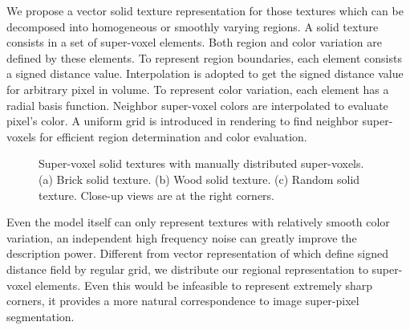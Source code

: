 We propose a vector solid texture representation for those textures which can be decomposed into homogeneous or smoothly varying regions. A solid texture consists in a set of super-voxel elements. Both region and color variation are defined by these elements. To represent region boundaries, each element consists a signed distance value. Interpolation is adopted to get the signed distance value for arbitrary pixel in volume. To represent color variation, each element has a radial basis function. Neighbor super-voxel colors are interpolated to evaluate pixel's color. A uniform grid is introduced in rendering to find neighbor super-voxels for efficient region determination and color evaluation. 

\begin{figure}[ht!]
	\centering
	\caption{Super-voxel solid textures with manually distributed super-voxels. (a) Brick solid texture. (b) Wood solid texture. (c) Random solid texture. Close-up views are at the right corners.}
	\label{fig:manual_svvts}
\end{figure}

Even the model itself can only represent textures with relatively smooth color variation, an independent high frequency noise can greatly improve the description power. Different from vector representation of \cite{wang2010vector,zhang2013efficient} which define signed distance field by regular grid, we distribute our regional representation to super-voxel elements. Even this would be infeasible to represent extremely sharp corners, it provides a more natural correspondence to image super-pixel segmentation.

